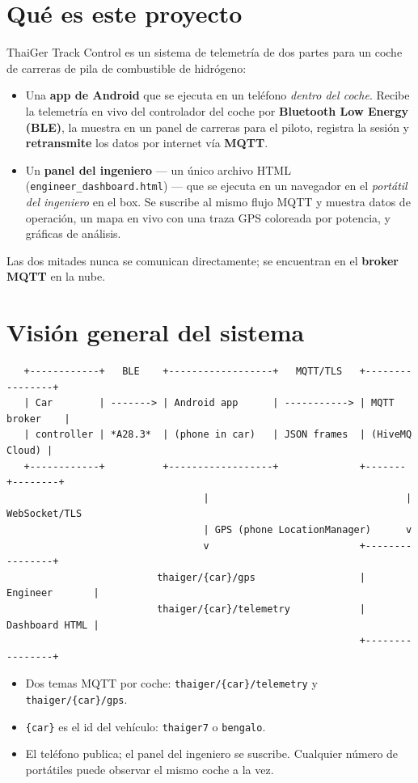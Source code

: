 \documentclass[11pt,a4paper,oneside]{report}
\newcommand{\code}[1]{\texttt{#1}}
\begin{document}
\section{Qué es este proyecto}
ThaiGer Track Control es un sistema de telemetría de dos partes para un coche de
carreras de pila de combustible de hidrógeno:
\begin{itemize}
  \item Una \textbf{app de Android} que se ejecuta en un teléfono \emph{dentro del
    coche}. Recibe la telemetría en vivo del controlador del coche por
    \textbf{Bluetooth Low Energy (BLE)}, la muestra en un panel de carreras para el
    piloto, registra la sesión y \textbf{retransmite} los datos por internet vía
    \textbf{MQTT}.
  \item Un \textbf{panel del ingeniero} --- un único archivo HTML
    (\code{engineer\_dashboard.html}) --- que se ejecuta en un navegador en el
    \emph{portátil del ingeniero} en el box. Se suscribe al mismo flujo MQTT y
    muestra datos de operación, un mapa en vivo con una traza GPS coloreada por
    potencia, y gráficas de análisis.
\end{itemize}
Las dos mitades nunca se comunican directamente; se encuentran en el
\textbf{broker MQTT} en la nube.

\section{Visión general del sistema}

\begin{lstlisting}
   +------------+   BLE    +------------------+   MQTT/TLS   +----------------+
   | Car        | -------> | Android app      | -----------> | MQTT broker    |
   | controller | *A28.3*  | (phone in car)   | JSON frames  | (HiveMQ Cloud) |
   +------------+          +------------------+              +-------+--------+
                                  |                                  | WebSocket/TLS
                                  | GPS (phone LocationManager)      v
                                  v                          +----------------+
                          thaiger/{car}/gps                  | Engineer       |
                          thaiger/{car}/telemetry            | Dashboard HTML |
                                                             +----------------+
\end{lstlisting}
\begin{itemize}
  \item Dos temas MQTT por coche: \code{thaiger/\{car\}/telemetry} y
    \code{thaiger/\{car\}/gps}.
  \item \code{\{car\}} es el id del vehículo: \code{thaiger7} o \code{bengalo}.
  \item El teléfono publica; el panel del ingeniero se suscribe. Cualquier número de
    portátiles puede observar el mismo coche a la vez.
\end{itemize}
\end{document}
